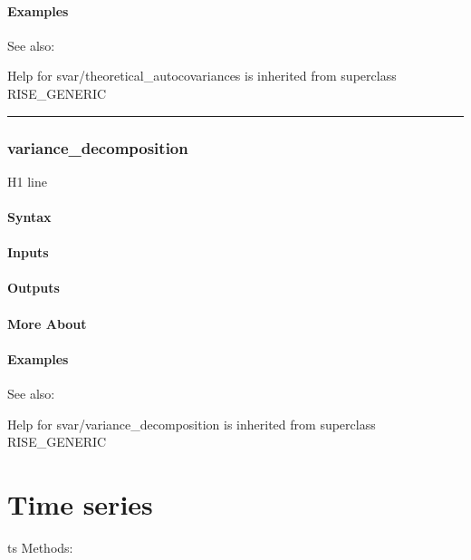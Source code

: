 \documentclass[letterpaper,10pt,english]{sphinxmanual}
\begin{document}
\subsubsection{Examples}
\label{classes/models/@svar/svar:id144}
See also:

Help for svar/theoretical\_autocovariances is inherited from superclass RISE\_GENERIC


\bigskip\hrule{}\bigskip



\subsection{variance\_decomposition}
\label{classes/models/@svar/svar:id145}\label{classes/models/@svar/svar:variance-decomposition}
H1 line


\subsubsection{Syntax}
\label{classes/models/@svar/svar:id146}

\subsubsection{Inputs}
\label{classes/models/@svar/svar:id147}

\subsubsection{Outputs}
\label{classes/models/@svar/svar:id148}

\subsubsection{More About}
\label{classes/models/@svar/svar:id149}

\subsubsection{Examples}
\label{classes/models/@svar/svar:id150}
See also:

Help for svar/variance\_decomposition is inherited from superclass RISE\_GENERIC


\chapter{Time series}
\label{classes/time_series/@ts/ts:time-series}\label{classes/time_series/@ts/ts::doc}
ts Methods:
\end{document}
